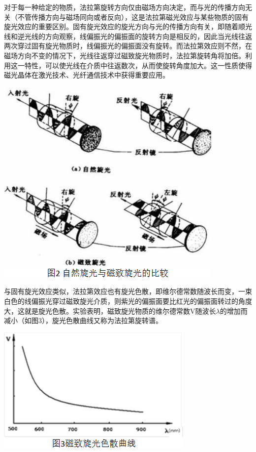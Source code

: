 \documentclass[hyperref]{ctexart}
\begin{document}
	对于每一种给定的物质，法拉第旋转方向仅由磁场方向决定，而与光的传播方向无关（不管传播方向与磁场同向或者反向），这是法拉第磁光效应与某些物质的固有旋光效应的重要区别。固有旋光效应的旋光方向与光的传播方向有关，即随着顺光线和逆光线的方向观察，线偏振光的偏振面的旋转方向是相反的，因此当光线往返两次穿过固有旋光物质时，线偏振光的偏振面没有旋转。而法拉第效应则不然，在磁场方向不变的情况下，光线往返穿过磁致旋光物质时，法拉第旋转角将加倍。利用这一特性，可以使光线在介质中往返数次，从而使旋转角度加大。这一性质使得磁光晶体在激光技术、光纤通信技术中获得重要应用。
	\begin{center}\includegraphics[scale=0.4]{t2}\end{center}

	与固有旋光效应类似，法拉第效应也有旋光色散，即维尔德常数随波长而变，一束白色的线偏振光穿过磁致旋光介质，则紫光的偏振面要比红光的偏振面转过的角度大，这就是旋光色散。实验表明，磁致旋光物质的维尔德常数V随波长$\lambda$的增加而减小（如图3），旋光色散曲线又称为法拉第旋转谱。
	\begin{center}\includegraphics[scale=0.4]{t3}\end{center}
\end{document}
